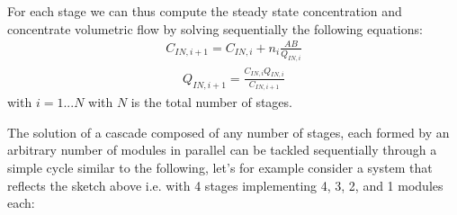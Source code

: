 \documentclass[letterpaper,10pt,english]{jupyterBook}
\begin{document}
\sphinxAtStartPar
For each stage we can thus compute the steady state concentration and concentrate volumetric flow by solving sequentially the following equations:
\begin{equation}\label{equation:Process_layouts:PLYeq19}
\begin{split}
C_{IN,i+1}=C_{IN,i}+n_i\frac{AB}{Q_{IN,i}}
\end{split}
\end{equation}\begin{equation}\label{equation:Process_layouts:PLYeq20}
\begin{split}
Q_{IN,i+1}=\frac{C_{IN,i}{Q_{IN,i}}}{C_{IN,i+1}}
\end{split}
\end{equation}
\sphinxAtStartPar
with \(i=1...N\) with \(N\) is the total number of stages.

\sphinxAtStartPar
{}

\sphinxAtStartPar
The solution of a cascade composed of any number of stages, each formed by an arbitrary number of modules in parallel can be tackled sequentially through a simple cycle similar to the following, let’s for example consider a system that reflects the sketch above i.e. with 4 stages implementing 4, 3, 2, and 1 modules each:
\end{document}
